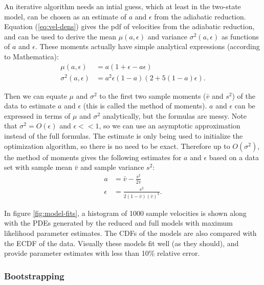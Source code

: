 \documentclass{article}
\begin{document}
An iterative algorithm needs an intial guess, which at least in the
two-state model, can be chosen as an estimate of $a$ and $\epsilon$
from the adiabatic reduction. Equation (\ref{eq:vel-dens}) gives the
pdf of velocities from the adiabatic reduction, and can be used to
derive the mean $\mu(a, \epsilon)$ and variance $\sigma^2(a,
\epsilon)$ as functions of $a$ and $\epsilon$. These moments actually
have simple analytical expressions (according to Mathematica):
\begin{align}
  \label{eq:mean-ar}
  \mu(a, \epsilon) &= a(1 + \epsilon - a \epsilon) \\
  \label{eq:var-ar}
  \sigma^2(a, \epsilon) &= a^2 \epsilon (1 - a) (2 + 5(1 - a) \epsilon).
\end{align}

Then we can equate $\mu$ and $\sigma^2$ to the first two sample
moments ($\bar{v}$ and $s^2$) of the data to estimate $a$ and
$\epsilon$ (this is called the method of moments). $a$ and $\epsilon$
can be expressed in terms of $\mu$ and $\sigma^2$ analytically, but
the formulas are messy. Note that $\sigma^2 = O(\epsilon)$ and
$\epsilon << 1$, so we can use an asymptotic approximation instead of
the full formulas. The estimate is only being used to initialize the
optimization algorithm, so there is no need to be exact. Therefore up
to $O(\sigma^2)$, the method of moments gives the following estimates
for $a$ and $\epsilon$ based on a data set with sample mean $\bar{v}$
and sample variance $s^2$:
\begin{align}
  \label{eq:mean-est}
  a &= \bar{v} - \frac{s^2}{2\bar{v}} \\
  \label{eq:var-est}
  \epsilon &= \frac{s^2}{2(1 - \bar{v})(\bar{v})^2}.
\end{align}

In figure \ref{fig:model-fits}, a histogram of 1000 sample velocities
is shown along with the PDEs generated by the reduced and full models
with maximum likelihood parameter estimates. The CDFs of the models
are also compared with the ECDF of the data. Visually these models fit
well (as they should), and provide parameter estimates with less than
10\% relative error.

\subsubsection{Bootstrapping}
\label{sec:bootstrapping}
\end{document}

